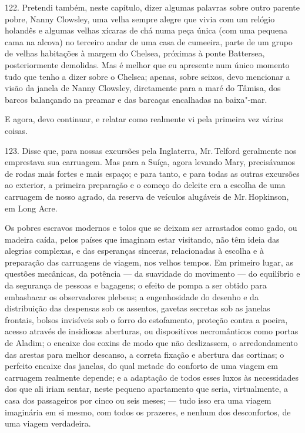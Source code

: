 122. Pretendi também, neste capítulo, dizer algumas palavras sobre outro
parente pobre, Nanny Clowsley, uma velha sempre alegre que vivia com um
relógio holandês e algumas velhas xícaras de chá numa peça única (com
uma pequena cama na alcova) no terceiro andar de uma casa de cumeeira,
parte de um grupo de velhas habitações à margem do Chelsea, próximas à
ponte Battersea, posteriormente demolidas. Mas é melhor que eu apresente
num único momento tudo que tenho a dizer sobre o Chelsea; apenas, sobre
seixos, devo mencionar a visão da janela de Nanny Clowsley, diretamente
para a maré do Tâmisa, dos barcos balançando na preamar e das barcaças
encalhadas na baixa"-mar.

E agora, devo continuar, e relatar como realmente vi pela primeira vez
várias coisas.

123. Disse que, para nossas excursões pela Inglaterra, Mr.\,Telford
geralmente nos emprestava sua carruagem. Mas para a Suíça, agora levando
Mary, precisávamos de rodas mais fortes e mais espaço; e para tanto, e
para todas as outras excursões ao exterior, a primeira preparação e o
começo do deleite era a escolha de uma carruagem de nosso agrado, da
reserva de veículos alugáveis de Mr.\,Hopkinson, em Long Acre.

Os pobres escravos modernos e tolos que se deixam ser arrastados como
gado, ou madeira caída, pelos países que imaginam estar visitando, não
têm ideia das alegrias complexas, e das esperanças sinceras,
relacionadas à escolha e à preparação das carruagens de viagem, nos
velhos tempos. Em primeiro lugar, as questões mecânicas, da potência ---
da suavidade do movimento --- do equilíbrio e da segurança de pessoas e
bagagens; o efeito de pompa a ser obtido para embasbacar os observadores
plebeus; a engenhosidade do desenho e da distribuição das despensas sob
os assentos, gavetas secretas sob as janelas frontais, bolsos invisíveis
sob o forro do estofamento, proteção contra a poeira, acesso através de
insidiosas aberturas, ou dispositivos necromânticos como portas de
Aladim; o encaixe dos coxins de modo que não deslizassem, o
arredondamento das arestas para melhor descanso, a correta fixação e
abertura das cortinas; o perfeito encaixe das janelas, do qual metade do
conforto de uma viagem em carruagem realmente depende; e a adaptação de
todos esses luxos às necessidades dos que ali iriam sentar, neste
pequeno apartamento que seria, virtualmente, a casa dos passageiros por
cinco ou seis meses; --- tudo isso era uma viagem imaginária em si mesmo,
com todos os prazeres, e nenhum dos desconfortos, de uma viagem
verdadeira.

